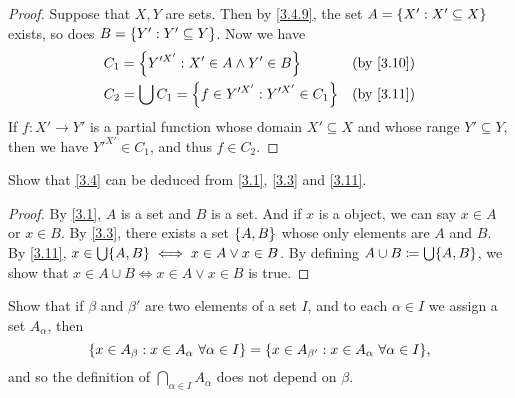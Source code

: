 \begin{proof}
  Suppose that \(X, Y\) are sets.
  Then by \cref{3.4.9}, the set \(A = \left\lbrace X' : X' \subseteq X\right\rbrace\) exists, so does \(B = \left\lbrace Y' : Y' \subseteq Y\right\rbrace\).
  Now we have
  \begin{align*}
    C_1 & = \set{Y'^{X'} : X' \in A \land Y' \in B}             &  & \by{3.10} \\
    C_2 & = \bigcup C_1 = \set{f \in Y'^{X'} : Y'^{X'} \in C_1} &  & \by{3.11} \\
  \end{align*}
  If \(f : X' \to Y'\) is a partial function whose domain \(X' \subseteq X\) and whose range \(Y' \subseteq Y\), then we have \(Y'^{X'} \in C_1\), and thus \(f \in C_2\).
\end{proof}

\begin{ex}\label{ex:3.4.8}
  Show that \cref{3.4} can be deduced from \cref{3.1}, \cref{3.3} and \cref{3.11}.
\end{ex}

\begin{proof}
  By \cref{3.1}, \(A\) is a set and \(B\) is a set.
  And if \(x\) is a object, we can say \(x \in A\) or \(x \in B\).
  By \cref{3.3}, there exists a set \(\left\lbrace A, B\right\rbrace\) whose only elements are \(A\) and \(B\).
  By \cref{3.11}, \(x \in \bigcup \set{A, B} \iff x \in A \lor x \in B\).
  By defining \(A \cup B \coloneqq \bigcup \set{A, B}\), we show that \(x \in A \cup B \iff x \in A \lor x \in B\) is true.
\end{proof}

\begin{ex}\label{ex:3.4.9}
  Show that if \(\beta\) and \(\beta'\) are two elements of a set \(I\), and to each \(\alpha \in I\) we assign a set \(A_{\alpha}\), then
  \[
    \set{x \in A_{\beta} : x \in A_{\alpha} \ \forall \alpha \in I} = \set{x \in A_{\beta'} : x \in A_{\alpha} \ \forall \alpha \in I},
  \]
  and so the definition of \(\bigcap_{\alpha \in I} A_{\alpha}\) does not depend on \(\beta\).
\end{ex}

